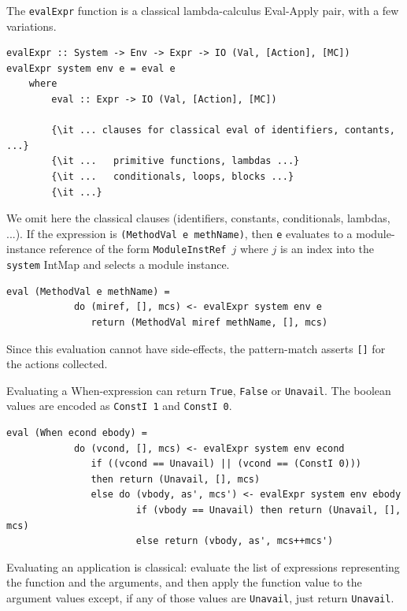 \documentclass[11pt]{article}
\newcommand{\term}[1]{\texttt{#1}}
\begin{document}
The \term{evalExpr} function is a classical lambda-calculus Eval-Apply
pair, with a few variations.

\begin{Verbatim}[frame=single, commandchars=\\\{\}]
evalExpr :: System -> Env -> Expr -> IO (Val, [Action], [MC])
evalExpr system env e = eval e
    where
        eval :: Expr -> IO (Val, [Action], [MC])

        {\it ... clauses for classical eval of identifiers, contants, ...}
        {\it ...   primitive functions, lambdas ...}
        {\it ...   conditionals, loops, blocks ...}
        {\it ...}
\end{Verbatim}

We omit here the classical clauses (identifiers, constants,
conditionals, lambdas, ...).  If the expression is \verb|(MethodVal e methName)|,
then \term{e} evaluates to a module-instance reference of
the form \term{ModuleInstRef}~$j$ where $j$ is an index into the
\term{system} IntMap and selects a module instance.

\begin{Verbatim}[frame=single, commandchars=\\\{\}]
        eval (MethodVal e methName) =
            do (miref, [], mcs) <- evalExpr system env e
               return (MethodVal miref methName, [], mcs)
\end{Verbatim}

Since this evaluation cannot have side-effects, the pattern-match
asserts \term{[]} for the actions collected.

Evaluating a When-expression can return \term{True}, \term{False} or
\term{Unavail}.  The boolean values are encoded as \verb|ConstI 1| and
\verb|ConstI 0|.

\begin{Verbatim}[frame=single, commandchars=\\\{\}]
        eval (When econd ebody) =
            do (vcond, [], mcs) <- evalExpr system env econd
               if ((vcond == Unavail) || (vcond == (ConstI 0)))
               then return (Unavail, [], mcs)
               else do (vbody, as', mcs') <- evalExpr system env ebody
                       if (vbody == Unavail) then return (Unavail, [], mcs)
                       else return (vbody, as', mcs++mcs')
\end{Verbatim}

Evaluating an application is classical: evaluate the list of
expressions representing the function and the arguments, and then
apply the function value to the argument values except, if any of
those values are \term{Unavail}, just return \term{Unavail}.
\end{document}
